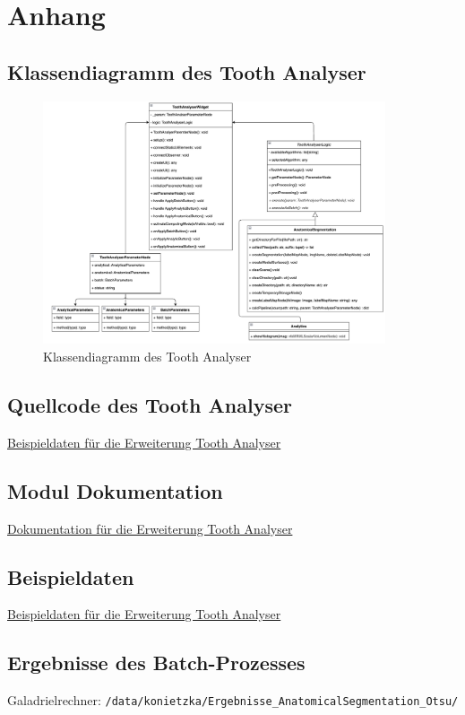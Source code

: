 \chapter{Anhang}
\label{chap:anhang}

\section{Klassendiagramm des Tooth Analyser}
\begin{figure}[h]
	\centering
	\includegraphics[width=0.9\textwidth, angle=90]{img/toothAnalyserClasses.png}
	\caption{Klassendiagramm des Tooth Analyser}
	\label{fig:klassendiagramm_gesamt}
\end{figure}

\section{Quellcode des Tooth Analyser}
\href{https://github.com/lukaskonietzka/SlicerToothAnalyser/blob/main/ToothAnalyser/ToothAnalyser.py}{Beispieldaten
für die Erweiterung Tooth Analyser}

\section{Modul Dokumentation}
\href{https://github.com/lukaskonietzka/SlicerToothAnalyser/tree/main}{Dokumentation
für die Erweiterung Tooth Analyser}

\section{Beispieldaten}
\href{https://github.com/lukaskonietzka/ToothAnalyserSampleData}{Beispieldaten
für die Erweiterung Tooth Analyser}

\section{Ergebnisse des Batch-Prozesses}
Galadrielrechner: \texttt{/data/konietzka/Ergebnisse\_AnatomicalSegmentation\_Otsu/}
